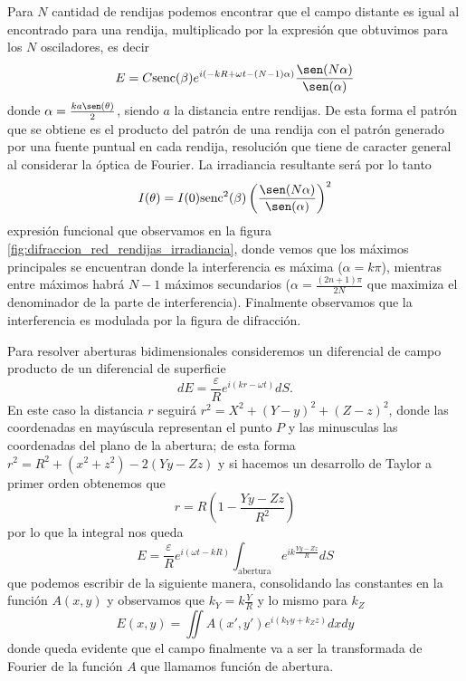 \documentclass[a4paper,spanish]{article}
\numberwithin{equation}{section}
\begin{document}
	Para $N$ cantidad de rendijas podemos encontrar que el campo distante es igual al encontrado para una rendija, multiplicado por la expresi\'on que obtuvimos para los $N$ osciladores, es decir
	\begin{equation}
		E = C \text{senc}(\beta) e^{i(-k R + \omega t - (N - 1)\alpha)} \frac{\sen(N \alpha)}{\sen(\alpha)}
		\label{eq:difraccion_red_rendijas}
	\end{equation}
	donde $\alpha = \frac{k a \sen(\theta)}{2}$, siendo $a$ la distancia entre rendijas. De esta forma el patr\'on que se obtiene es el producto del patr\'on de una rendija con el patr\'on generado por una fuente puntual en cada rendija, resoluci\'on que tiene de caracter general al considerar la \'optica de Fourier. La irradiancia resultante ser\'a por lo tanto
	\begin{equation}
		I(\theta) = I(0) \text{senc}^2(\beta) \left(\frac{\sen(N\alpha)}{\sen(\alpha)}\right)^2
		\label{eq:difraccion_red_rendijas_irradiancia}
	\end{equation}
	expresi\'on funcional que observamos en la figura \ref{fig:difraccion_red_rendijas_irradiancia}, donde vemos que los m\'aximos principales se encuentran donde la interferencia es m\'axima ($\alpha = k \pi$), mientras entre m\'aximos habr\'a $N - 1$ m\'aximos secundarios ($\alpha = \frac{(2 n + 1)\pi}{2N}$ que maximiza el denominador de la parte de interferencia). Finalmente observamos que la interferencia es modulada por la figura de difracci\'on.
	
	
	Para resolver aberturas bidimensionales consideremos un diferencial de campo producto de un diferencial de superficie \[ dE = \frac{\varepsilon}{R} e^{i (k r - \omega t)} dS.\] En este caso la distancia $r$ seguir\'a $r^2 = X^2 + (Y - y)^2 + (Z - z)^2$, donde las coordenadas en may\'uscula representan el punto $P$ y las minusculas las coordenadas del plano de la abertura; de esta forma $r^2 = R^2 + (x^2 +z^2) - 2(Yy - Zz)$ y si hacemos un desarrollo de Taylor a primer orden obtenemos que \[r = R \left(1 - \frac{Yy - Zz}{R^2}\right)\] por lo que la integral nos queda
	\begin{equation}
		E = \frac{\varepsilon}{R} e^{i(\omega t - k R)} \int_{\text{abertura}} e^{i k \frac{Yy - Zz}{R}} dS
		\label{eq:difraccion_abertura_bidimensional}
	\end{equation}
	que podemos escribir de la siguiente manera, consolidando las constantes en la funci\'on $A(x,y)$ y observamos que $k_Y = k \frac{Y}{R}$ y lo mismo para $k_Z$
	\begin{equation}
		E(x,y) = \iint A(x',y') e^{i (k_Y y + k_Z z)} dx dy
		\label{eq:difraccion_general}
	\end{equation}
	donde queda evidente que el campo finalmente va a ser la transformada de Fourier de la funci\'on $A$ que llamamos funci\'on de abertura.
	
\end{document}
